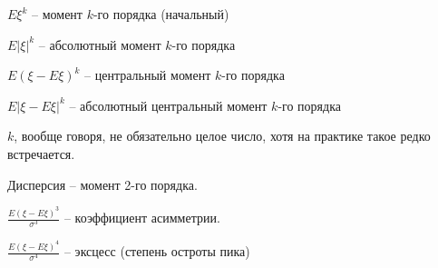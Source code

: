 \begin{Def}
$E\xi^k$ -- момент $k$-го порядка (начальный)

$E|\xi|^k$ -- абсолютный момент $k$-го порядка

$E(\xi - E\xi)^k$ -- центральный момент $k$-го порядка

$E|\xi - E\xi|^k$ -- абсолютный центральный момент $k$-го порядка
\end{Def}
\begin{Rem}
$k$, вообще говоря, не обязательно целое число, хотя на практике такое редко встречается.
\end{Rem}
\begin{Rem}
Дисперсия -- момент 2-го порядка.
\end{Rem}
\begin{Rem}
$\frac{E(\xi - E\xi)^3}{\sigma^3}$ -- коэффициент асимметрии.
\end{Rem}
\begin{Rem}
$\frac{E(\xi - E\xi)^4}{\sigma^4}$ -- эксцесс (степень остроты пика)
\end{Rem}
